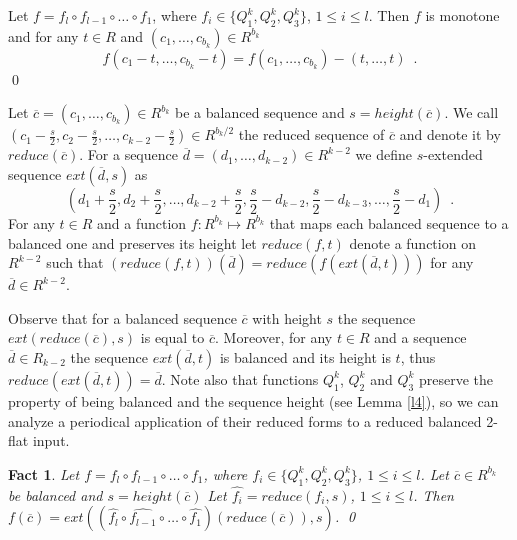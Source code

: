 \documentclass{llncs}
\newtheorem{fact}[theorem]{Fact}
\begin{document}
\begin{corollary}
Let $f = f_l\circ f_{l-1}\circ\ldots\circ f_1$, where $f_i\in\{Q^k_1,
Q^k_2, Q^k_3\}$, $1\le i\le l$. Then $f$ is monotone and for any $t\in
R$ and $(c_1,\ldots,c_{b_k})\in R^{b_k}$
\[ f(c_1-t,\ldots,c_{b_k}-t) =  
             f(c_1,\ldots,c_{b_k}) - (t,\ldots,t) \enspace .\] \qed
\end{corollary} 

\begin{definition} \label{reduce}
Let $\overline{c}=(c_1,\ldots,c_{b_k})\in R^{b_k}$ be a balanced
sequence and $s=height(\overline{c})$. We call $(c_1-\frac{s}{2},
c_2-\frac{s}{2}, \ldots, c_{k-2}-\frac{s}{2})\in R^{b_k/2}$ the reduced
sequence of $\overline{c}$ and denote it by $reduce(\overline{c})$. For
a sequence $\overline{d} = (d_1, \ldots, d_{k-2})\in R^{k-2}$ we define
$s$-extended sequence $ext(\overline{d},s)$ as
\[(d_1+\frac{s}{2}, d_2+\frac{s}{2}, \ldots, d_{k-2}+\frac{s}{2}, 
  \frac{s}{2}-d_{k-2}, \frac{s}{2}-d_{k-3}, \ldots, \frac{s}{2}-d_1) \enspace .\]
For any $t\in R$ and a function $f: R^{b_k}\mapsto R^{b_k}$ that maps
each balanced sequence to a balanced one and preserves its height let
$reduce(f,t)$ denote a function on $R^{k-2}$ such that
$(reduce(f,t))(\overline{d}) = reduce(f(ext(\overline{d},t)))$ for any
$\overline{d}\in R^{k-2}$.
\end{definition}

Observe that for a balanced sequence $\overline{c}$ with height $s$ the
sequence $ext(reduce(\overline{c}),s)$ is equal to
$\overline{c}$. Moreover, for any $t\in R$ and a sequence
$\overline{d}\in R_{k-2}$ the sequence $ext(\overline{d},t)$ is balanced
and its height is $t$, thus $reduce(ext(\overline{d},t)) =
\overline{d}$. Note also that functions $Q^k_1$, $Q^k_2$ and $Q^k_3$
preserve the property of being balanced and the sequence height (see
Lemma \ref{l4}), so we can analyze a periodical application of their
reduced forms to a reduced balanced 2-flat input.

\begin{fact}
Let $f = f_l\circ f_{l-1}\circ\ldots\circ f_1$, where $f_i\in\{Q^k_1,
Q^k_2, Q^k_3\}$, $1\le i\le l$. Let $\overline{c}\in R^{b_k}$ be
balanced and $s=height(\overline{c})$ Let $\hat{f_i} = reduce(f_i,s)$,
$1\le i\le l$. Then $f(\overline{c}) = ext((\hat{f_l} \circ
\hat{f_{l-1}} \circ \ldots \circ
\hat{f_1})(reduce(\overline{c})),s)$. \qed
\end{fact}
\end{document}
